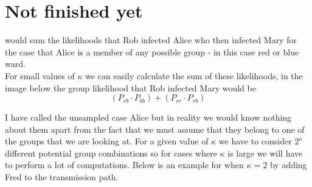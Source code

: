 \documentclass[11pt,a4paper]{report}
\begin{document}
\section{Not finished yet}
would sum the likelihoods that Rob infected Alice who then infected Mary for the case that Alice is a member of any possible group - in this case red or blue ward.\\
For small values of $\kappa$ we can easily calculate the sum of these likelihoods, in the image below the group likelihood that Rob infected Mary would be
 \[ (P_{rb} \cdot P_{bb}) + (P_{rr} \cdot P_{rb}) \]

\begin{center}
\end{center}	
I have called the unsampled case Alice but in reality we would know nothing about them apart from the fact that we must assume that they belong to one of the groups that we are looking at. For a given value of $\kappa$ we have to consider $2^\kappa$ different potential group combinations so for cases where $\kappa$ is large we will have to perform a lot of computations. Below is an example for when $\kappa = 2$ by adding Fred to the transmission path.
\end{document}
